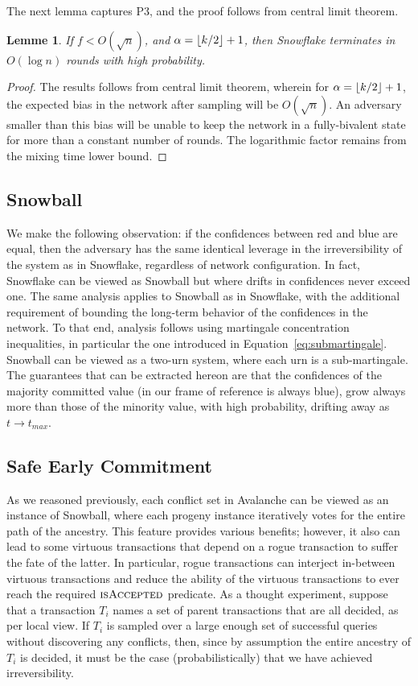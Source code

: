 \documentclass[letterpaper,twocolumn,10pt]{article}
\DeclarePairedDelimiter{\floor}{\lfloor}{\rfloor}
\newcommand{\Oh}[1]{O(#1)}
\newtheorem{lemma}[theorem]{Lemme}
\theoremstyle{definition}
\begin{document}
\begin{appendices}
The next lemma captures P3, and the proof follows from central limit theorem. 
\begin{lemma}
If $f < \Oh{\sqrt{n}}$, and $\alpha = \floor{k/2} + 1$, then Snowflake terminates in $\Oh{\log n}$ rounds with high probability. 
\label{lemma:centrallimit}
\end{lemma}
\begin{proof}
The results follows from central limit theorem, wherein for $\alpha = \floor{k/2} + 1$, the expected bias in the network after sampling will be $\Oh{\sqrt{n}}$. An adversary smaller than this bias will be unable to keep the network in a fully-bivalent state for more than a constant number of rounds. The logarithmic factor remains from the mixing time lower bound. 
\end{proof}

\subsection{Snowball}
We make the following observation: if the confidences between red and blue are equal, then the adversary has the same identical leverage in the irreversibility of the system as in Snowflake, regardless of network configuration. In fact, Snowflake can be viewed as Snowball but where drifts in confidences never exceed one. The same analysis applies to Snowball as in Snowflake, with the additional requirement of bounding the long-term behavior of the confidences in the network. To that end, analysis follows using martingale concentration inequalities, in particular the one introduced in Equation~\ref{eq:submartingale}. Snowball can be viewed as a two-urn system, where each urn is a sub-martingale. The guarantees that can be extracted hereon are that the confidences of the majority committed value (in our frame of reference is always blue), grow always more than those of the minority value, with high probability, drifting away as $t \rightarrow t_{max}$. 
\subsection{Safe Early Commitment}
As we reasoned previously, each conflict set in Avalanche can be viewed as an instance of Snowball, where each progeny instance iteratively votes for the entire path of the ancestry.
This feature provides various benefits; however, it also can lead to some virtuous transactions that depend on a rogue transaction to suffer the fate of the latter.
In particular, rogue transactions can interject in-between virtuous transactions and reduce the ability of the virtuous transactions to ever reach the required $\textsc{isAccepted}$ predicate.
As a thought experiment, suppose that a transaction $T_i$ names a set of parent transactions that are all decided, as per local view.
If $T_i$ is sampled over a large enough set of successful queries without discovering any conflicts, then, since by assumption the entire ancestry of $T_i$ is decided, it must be the case (probabilistically) that we have achieved irreversibility.


\end{appendices}
\end{document}

